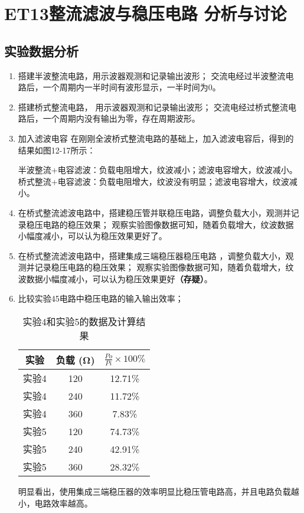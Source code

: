 \documentclass[dvipsnames, svgnames,a4paper,11pt]{article}
\begin{document}
	\section{ET13整流滤波与稳压电路 \quad\heiti 分析与讨论}
	
	\subsection{实验数据分析}
	\begin{enumerate}
 \item 搭建半波整流电路，用示波器观测和记录输出波形；
交流电经过半波整流电路后，一个周期内一半时间有波形显示，一半时间为0。






\item 搭建桥式整流电路， 用示波器观测和记录输出波形；
交流电经过桥式整流电路后，一个周期内没有输出为零，存在周期波形。







\item 加入滤波电容
 在刚刚全波桥式整流电路的基础上，加入滤波电容后，得到的结果如图12-17所示：

半波整流+电容滤波：负载电阻增大，纹波减小；滤波电容增大，纹波减小。
桥式整流+电容滤波：负载电阻增大，纹波没有明显；滤波电容增大，纹波减小。

 \item 在桥式整流滤波电路中，搭建稳压管并联稳压电路，调整负载大小，观测并记录稳压电路的稳压效果；
观察实验图像数据可知，随着负载增大，纹波数据小幅度减小，可以认为稳压效果更好了。




\item 在桥式整流滤波电路中，搭建集成三端稳压器稳压电路 ，调整负载大小，观测并记录稳压电路的稳压效果；
观察实验图像数据可知，随着负载增大，纹波数据小幅度减小，可以认为稳压效果更好\textbf{（存疑）}。
\item 比较实验45电路中稳压电路的输入输出效率；

	\begin{table}[H]
		\centering
		\caption{实验4和实验5的数据及计算结果}
		\begin{tabular}{|c|c|c|}
			\hline
			实验 & 负载 (Ω) & $\frac{Po}{Pi} \times 100\%$ \\
			\hline
			实验4 & 120 & 12.71\% \\
			\hline
			实验4 & 240 & 11.72\% \\
			\hline
			实验4 & 360 & 7.83\% \\
			\hline
			实验5 & 120 & 74.73\% \\
			\hline
			实验5 & 240 & 42.91\% \\
			\hline
			实验5 & 360 & 28.32\% \\
			\hline
		\end{tabular}
	\end{table}
	明显看出，使用集成三端稳压器的效率明显比稳压管电路高，并且电路负载越小，电路效率越高。
\end{enumerate}
\end{document}
